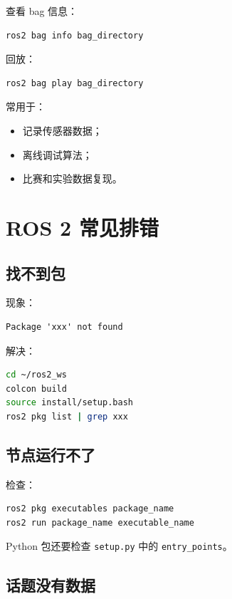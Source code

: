 \documentclass[UTF8,a4paper,12pt]{ctexart}
\begin{document}
查看 bag 信息：

\begin{lstlisting}[language=bash]
ros2 bag info bag_directory
\end{lstlisting}

回放：

\begin{lstlisting}[language=bash]
ros2 bag play bag_directory
\end{lstlisting}

常用于：
\begin{itemize}
    \item 记录传感器数据；
    \item 离线调试算法；
    \item 比赛和实验数据复现。
\end{itemize}

\section{ROS 2 常见排错}

\subsection{找不到包}

现象：

\begin{lstlisting}
Package 'xxx' not found
\end{lstlisting}

解决：

\begin{lstlisting}[language=bash]
cd ~/ros2_ws
colcon build
source install/setup.bash
ros2 pkg list | grep xxx
\end{lstlisting}

\subsection{节点运行不了}

检查：
\begin{lstlisting}[language=bash]
ros2 pkg executables package_name
ros2 run package_name executable_name
\end{lstlisting}

Python 包还要检查 \texttt{setup.py} 中的 \texttt{entry\_points}。

\subsection{话题没有数据}
\end{document}
